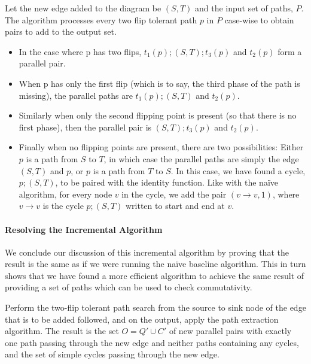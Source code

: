 \documentclass[sigplan,review]{acmart}
\begin{document}
Let the new edge added to the diagram be $(S, T)$ and the input set of paths, $P$.
The algorithm processes every two flip tolerant path $p$ in $P$ case-wise to obtain pairs to add to the output set.
\begin{itemize}
\item In the case where p has two flips, $t_1(p) ; (S, T) ; t_3(p)$ and $t_2(p)$ form a parallel pair.
\item When p has only the first flip (which is to say, the third phase of the path is missing), the parallel paths are $t_1(p) ; (S, T)$ and $t_2(p)$.
\item Similarly when only the second flipping point is present (so that there is no first phase), then the parallel pair is  $(S, T) ; t_3(p)$ and $t_2(p)$.
\item Finally when no flipping points are present, there are two possibilities:
Either $p$ is a path from $S$ to $T$, in which case the parallel paths are simply the edge $(S, T)$ and $p$, or $p$ is a path from $T$ to $S$.
In this case, we have found a cycle, $p ; (S,T)$, to be paired with the identity function.
Like with the na\"{i}ve algorithm, for every node $v$ in the cycle, we add the pair $(v \rightarrow v, 1)$, where $v \rightarrow v$ is the cycle $p ; (S,T)$ written to start and end at $v$.
\end{itemize}

\paragraph{Resolving the Incremental Algorithm}
We conclude our discussion of this incremental algorithm by proving that the result is the same as if we were running the na\"{i}ve baseline algorithm.  This in turn shows that we have found a more efficient algorithm to achieve the same result of providing a set of paths which can be used to check commutativity.

\begin{theorem}
    Perform the two-flip tolerant path search from the source to sink node of the edge that is to be added followed, and on the output, apply the path extraction algorithm. 
    The result is the set $O = Q'\cup C'$ of new parallel pairs with exactly one path passing through the new edge and neither paths containing any cycles, and the set of simple cycles passing through the new edge.
\end{theorem}
\end{document}
